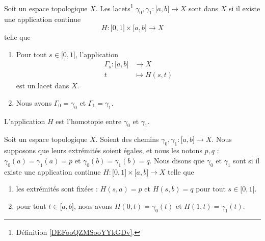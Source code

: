 \begin{definition}     \label{DEFooHJQTooYUFcee}
	Soit un espace topologique \( X\). Les lacets\footnote{Définition \ref{DEFooQZMSooYYkGDv}.} \( \gamma_0,\gamma_1\colon \mathopen[ a , b \mathclose]\to X\) sont  dans \( X\) si il existe une application continue
	\begin{equation}
		H\colon \mathopen[ 0 , 1 \mathclose]\times \mathopen[ a , b \mathclose]\to X
	\end{equation}
	telle que
	\begin{enumerate}
		\item
		      Pour tout \( s\in\mathopen[ 0 , 1 \mathclose]\), l'application
		      \begin{equation}
			      \begin{aligned}
				      \Gamma_s\colon \mathopen[ a , b \mathclose] & \to X          \\
				      t                                           & \mapsto H(s,t)
			      \end{aligned}
		      \end{equation}
		      est un lacet dans \( X\).
		\item
		      Nous avons \( \Gamma_0=\gamma_0\) et \( \Gamma_1=\gamma_1\).
	\end{enumerate}
	L'application \( H\) est l'homotopie entre \( \gamma_0\) et \( \gamma_1\).
\end{definition}

\begin{definition}   \label{DEFooLXDTooDPgxqL}
	Soit un espace topologique \( X\). Soient des chemins \( \gamma_0,\gamma_1\colon \mathopen[ a , b \mathclose]\to X\). Nous supposons que leurs extrémités soient égales, et nous les notons \( p,q\) : \( \gamma_0(a)=\gamma_1(a)=p\) et \( \gamma_0(b)=\gamma_1(b)=q\). Nous disons que \( \gamma_0\) et \( \gamma_1\) sont  si il existe une application continue \( H\colon \mathopen[ 0 , 1 \mathclose]\times \mathopen[ a , b \mathclose]\to X\) telle que
	\begin{enumerate}
		\item
		      les extrémités sont fixées : \( H(s,a)=p\) et \( H(s,b)=q\) pour tout \( s\in \mathopen[ 0 , 1 \mathclose]\).
		\item
		      pour tout \( t\in\mathopen[ a , b \mathclose]\), nous avons \( H(0,t) =\gamma_0(t) \) et \( H(1,t)=\gamma_1(t)\).
	\end{enumerate}
\end{definition}

